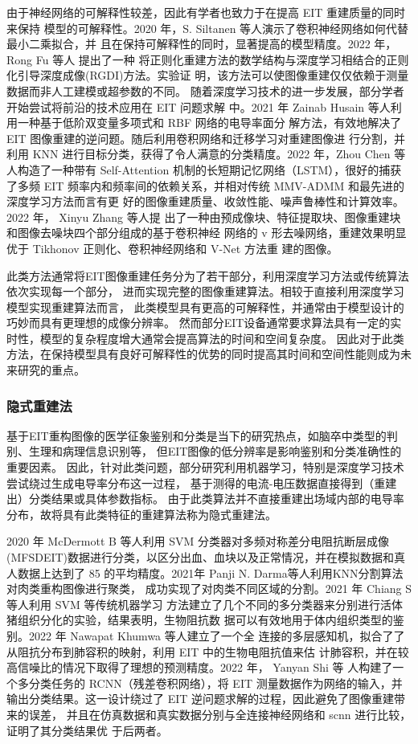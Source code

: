 由于神经网络的可解释性较差，因此有学者也致力于在提高 EIT 重建质量的同时来保持
模型的可解释性。2020 年，S. Siltanen 等人演示了卷积神经网络如何代替最小二乘拟合，并
且在保持可解释性的同时，显著提高的模型精度\cite{9231717}。2022 年，Rong Fu 等人 提出了一种
将正则化重建方法的数学结构与深度学习相结合的正则化引导深度成像(RGDI)方法。实验证
明，该方法可以使图像重建仅仅依赖于测量数据而非人工建模或超参数的不同\cite{9739002}。
随着深度学习技术的进一步发展，部分学者开始尝试将前沿的技术应用在 EIT 问题求解
中。2021 年 Zainab Husain 等人利用一种基于低阶双变量多项式和 RBF 网络的电导率面分
解方法，有效地解决了 EIT 图像重建的逆问题。随后利用卷积网络和迁移学习对重建图像进
行分割，并利用 KNN 进行目标分类，获得了令人满意的分类精度\cite{9336698}。2022 年，Zhou Chen
等人构造了一种带有 Self-Attention 机制的长短期记忆网络（LSTM），很好的捕获了多频 EIT
频率内和频率间的依赖关系，并相对传统 MMV-ADMM 和最先进的深度学习方法而言有更
好的图像重建质量、收敛性能、噪声鲁棒性和计算效率\cite{9732193}。2022 年， Xinyu Zhang 等人提
出了一种由预成像块、特征提取块、图像重建块和图像去噪块四个部分组成的基于卷积神经
网络的 v 形去噪网络，重建效果明显优于 Tikhonov 正则化、卷积神经网络和 V-Net 方法重
建的图像\cite{9754540}。

此类方法通常将EIT图像重建任务分为了若干部分，利用深度学习方法或传统算法依次实现每一个部分，
进而实现完整的图像重建算法。相较于直接利用深度学习模型实现重建算法而言，
此类模型具有更高的可解释性，并通常由于模型设计的巧妙而具有更理想的成像分辨率。
然而部分EIT设备通常要求算法具有一定的实时性，模型的复杂程度增大通常会提高算法的时间和空间复杂度。
因此对于此类方法，在保持模型具有良好可解释性的优势的同时提高其时间和空间性能则成为未来研究的重点。

\subsubsection{隐式重建法}
基于EIT重构图像的医学征象鉴别和分类是当下的研究热点，如脑卒中类型的判别、生理和病理信息识别等，
但EIT图像的低分辨率是影响鉴别和分类准确性的重要因素。
因此，针对此类问题，部分研究利用机器学习，特别是深度学习技术尝试绕过生成电导率分布这一过程，
基于测得的电流-电压数据直接得到（重建出）分类结果或具体参数指标。
由于此类算法并不直接重建出场域内部的电导率分布，故将具有此类特征的重建算法称为隐式重建法。 

2020 年 McDermott B 等人利用 SVM 分类器对多频对称差分电阻抗断层成像(MFSDEIT)数据进行分类，以区分出血、血块以及正常情况，并在模拟数据和真人数据上达到了 85%
的平均精度\cite{article1234568}。2021年 Panji N. Darma等人利用KNN分割算法对肉类重构图像进行聚类，
成功实现了对肉类不同区域的分割\cite{9625686}。2021 年 Chiang S 等人利用 SVM 等传统机器学习
方法建立了几个不同的多分类器来分别进行活体猪组织分化的实验，结果表明，生物阻抗数
据可以有效地用于体内组织类型的鉴别\cite{app9194049}。2022 年 Nawapat Khumwa 等人建立了一个全
连接的多层感知机，拟合了了从阻抗分布到肺容积的映射，利用 EIT 中的生物电阻抗值来估
计肺容积，并在较高信噪比的情况下取得了理想的预测精度\cite{9741619}。2022 年， Yanyan Shi 等
人构建了一个多分类任务的 RCNN（残差卷积网络），将 EIT 测量数据作为网络的输入，并
输出分类结果。这一设计绕过了 EIT 逆问题求解的过程，因此避免了图像重建带来的误差，
并且在仿真数据和真实数据分别与全连接神经网络和 scnn 进行比较，证明了其分类结果优
于后两者\cite{9751762}。

